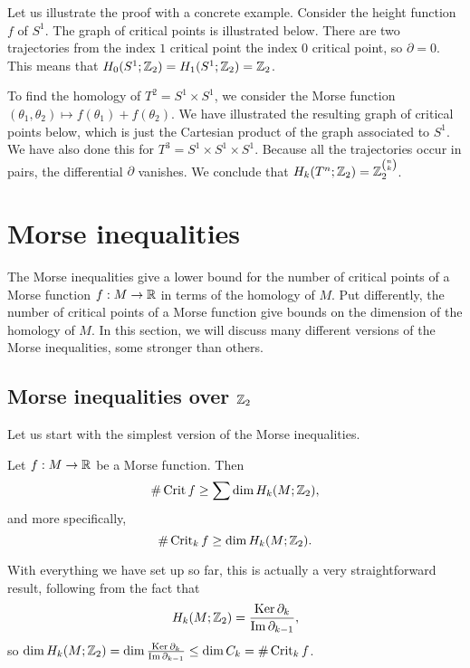 \begin{eg}
    Let us illustrate the proof with a concrete example.
    Consider the height function $f$ of $S^{1}$. The graph of critical points is illustrated below.
    There are two trajectories from the index $1$ critical point the index $0$ critical point, so $\partial = 0$. This means that $H_0(S^{1}; \mathbb{Z}_2) = H_1(S^{1}; \mathbb{Z}_2) = \mathbb{Z}_2$.

    To find the homology of $T^2 = S^{1} \times S^{1}$, we consider the Morse function $(\theta_1, \theta_2) \mapsto f(\theta_1) + f(\theta_2)$.
    We have illustrated the resulting graph of critical points below, which is just the Cartesian product of the graph associated to $S^{1}$. 
    We have also done this for $T^{3} = S^{1} \times S^{1} \times S^{1}$.
    Because all the trajectories occur in pairs, the differential $\partial$ vanishes. We conclude that $H_k(T^{n}; \mathbb{Z}_2) = \mathbb{Z}_2^{\binom{n}{k}}$.
\begin{figure}[H]
    \centering
\end{figure}
\end{eg}


\section{Morse inequalities}
The Morse inequalities give a lower bound for the number of critical points of a Morse function $f:M \to  \mathbb{R}$ in terms of the homology of $M$.
Put differently, the number of critical points of a Morse function give bounds on the dimension of the homology of $M$.
In this section, we will discuss many different versions of the Morse inequalities, some stronger than others.

\subsection{Morse inequalities over $\mathbb{Z}_2$}
Let us start with the simplest version of the Morse inequalities.

\begin{theorem}
    Let $f: M \to  \mathbb{R}$ be a Morse function. Then
    \[
        \# \operatorname{Crit} f \ge \sum \dim H_k(M; \mathbb{Z}_2)
    ,\]
    and more specifically,
    \[
        \# \operatorname{Crit}_k f \ge \dim H_k(M; \mathbb{Z}_2)
    .\]
\end{theorem}
\begin{myproof}
    With everything we have set up so far, this is actually a very straightforward result, following from the fact that \[
    H_k(M; \mathbb{Z}_2) = \frac{\operatorname{Ker} \partial_k}{\operatorname{Im} \partial_{k-1}},
    \] so $\dim H_k(M; \mathbb{Z}_2) = \dim \frac{\operatorname{Ker} \partial_k}{\operatorname{Im} \partial_{k-1}} \le  \dim C_k = \# \operatorname{Crit}_k f$.
\end{myproof}

